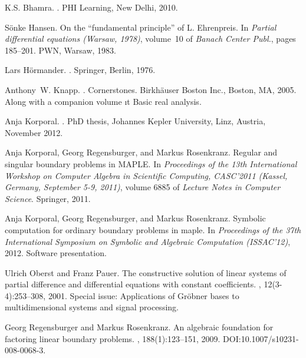 \documentclass[a4paper]{llncs}
\begin{document}
\begin{thebibliography}{10}

K.S. Bhamra.
.
\newblock PHI Learning, New Delhi, 2010.

S{\"o}nke Hansen.
\newblock On the ``fundamental principle'' of {L}. {E}hrenpreis.
\newblock In {\em Partial differential equations ({W}arsaw, 1978)}, volume~10
  of {\em Banach Center Publ.}, pages 185--201. PWN, Warsaw, 1983.

Lars H{\"o}rmander.
.
\newblock Springer, Berlin, 1976.

Anthony~W. Knapp.
.
\newblock Cornerstones. Birkh\"auser Boston Inc., Boston, MA, 2005.
\newblock Along with a companion volume {{\i}t Basic real analysis}.

Anja Korporal.
.
\newblock PhD thesis, Johannes Kepler University, Linz, Austria, November 2012.

Anja Korporal, Georg Regensburger, and Markus Rosenkranz.
\newblock Regular and singular boundary problems in {MAPLE}.
\newblock In {\em Proceedings of the 13th International Workshop on Computer
  Algebra in Scientific Computing, CASC'2011 (Kassel, Germany, September 5-9,
  2011)}, volume 6885 of {\em Lecture Notes in Computer Science}. Springer,
  2011.

Anja Korporal, Georg Regensburger, and Markus Rosenkranz.
\newblock Symbolic computation for ordinary boundary problems in maple.
\newblock In {\em Proceedings of the 37th International Symposium on Symbolic
  and Algebraic Computation (ISSAC'12)}, 2012.
\newblock Software presentation.

Ulrich Oberst and Franz Pauer.
\newblock The constructive solution of linear systems of partial difference and
  differential equations with constant coefficients.
, 12(3-4):253--308, 2001.
\newblock Special issue: Applications of Gr{\"o}bner bases to multidimensional
  systems and signal processing.

Georg Regensburger and Markus Rosenkranz.
\newblock An algebraic foundation for factoring linear boundary problems.
, 188(1):123--151, 2009.
\newblock DOI:10.1007/s10231-008-0068-3.


\end{thebibliography}
\end{document}

